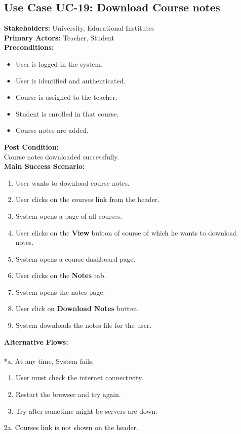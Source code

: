 \subsection{Use Case UC-19: Download Course notes}
\textbf{Stakeholders: } University, Educational Institutes \\
\textbf{Primary Actors: }Teacher, Student \\
\textbf{Preconditions:}
\begin{itemize}
\item User is logged in the system.
\item User is identified and authenticated.
\item Course is assigned to the teacher.
\item Student is enrolled in that course.
\item Course notes are added.
\end{itemize}
\textbf{Post Condition: }\\
Course notes downloaded successfully.\\
\textbf{Main Success Scenario:}
\begin{enumerate}
\item User wants to download course notes.
\item User clicks on the courses link from the header.
\item System opens a page of all courses.
\item User clicks on the \textbf{View} button of course of which he wants to download notes.
\item System opens a course dashboard page.
\item User clicks on the \textbf{Notes} tab.
\item System opens the notes page.
\item User click on \textbf{Download Notes} button.
\item System downloads the notes file for the user.
\end{enumerate}
\textbf{Alternative Flows:}\\
\\
*a. At any time, System fails.
\begin{enumerate}
\item User must check the internet connectivity.
\item Restart the browser and try again.
\item Try after sometime might be servers are down.
\end{enumerate}
2a. Courses link is not shown on the header.

